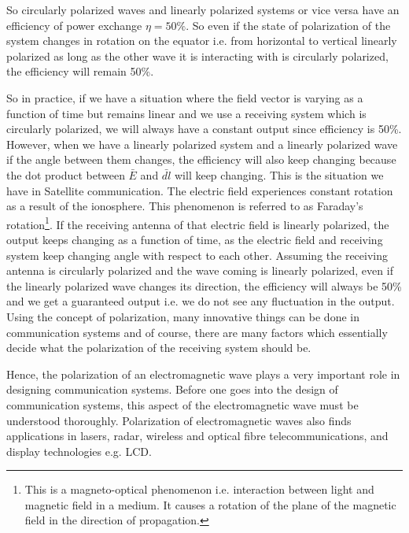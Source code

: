 So circularly polarized waves and linearly polarized systems or vice versa have an efficiency of power exchange $ \eta=  50\% $. So even if the state of polarization of the system changes in rotation on the equator i.e. from horizontal to vertical linearly polarized as long as the other wave it is interacting with is circularly polarized, the efficiency will remain 50\%.

So in practice, if we have a situation where the field vector is varying as a function of time but remains linear and we use a receiving system which is circularly polarized, we will always have a constant output since efficiency is 50\%. However, when we have a linearly polarized system and a linearly polarized wave if the angle between them changes, the efficiency will also keep changing because the dot product between $ \bar {E} $ and $ \bar{dl} $ will keep changing. This is the situation we have in Satellite communication. The electric field experiences constant rotation as a result of the ionosphere. This phenomenon is referred to as Faraday's rotation\footnote{This is a magneto-optical phenomenon i.e. interaction between light and magnetic field in a medium. It causes a rotation of the plane of the magnetic field in the direction of propagation.}. If the receiving antenna of that electric field is linearly polarized, the output keeps changing as a function of time, as the electric field and receiving system keep changing angle with respect to each other. Assuming the receiving antenna is circularly polarized and the wave coming is linearly polarized, even if the linearly polarized wave changes its direction, the efficiency will always be 50\% and we get a guaranteed output i.e. we do not see any fluctuation in the output. Using the concept of polarization, many innovative things can be done in communication systems and of course, there are many factors which essentially decide what the polarization of the receiving system should be.

Hence, the polarization of an electromagnetic wave plays a very important role in designing communication systems. Before one goes into the design of communication systems, this aspect of the electromagnetic wave must be understood thoroughly. Polarization of electromagnetic waves also finds applications in lasers, radar, wireless and optical fibre telecommunications, and display technologies e.g. LCD.

